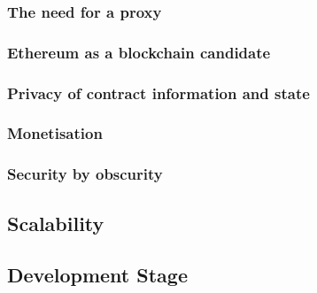 \subsubsection{The need for a proxy}



\subsubsection{Ethereum as a blockchain candidate}

\subsubsection{Privacy of contract information and state}

\subsubsection{Monetisation}

\subsubsection{Security by obscurity}

\subsection{Scalability}

\subsection{Development Stage}
